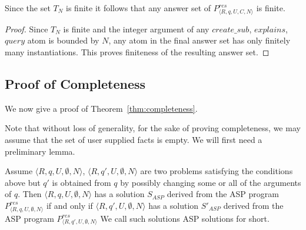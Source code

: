 \begin{lemma}
Since the set $T_{N}$ is finite it follows that any answer set of $P_{\langle
  R,q,U,C,N \rangle}^{res}$ is finite.
\end{lemma}

\begin{proof}
Since $T_{N}$ is finite and the integer argument of any $create\_sub$, $explains$, $query$ 
atom is bounded by $N$, any atom in the final answer set has only finitely
many instantiations. This proves finiteness of the resulting answer set.
\end{proof}

\subsection{Proof of Completeness}\label{sec:proof_completeness}

We now give a proof of Theorem~\ref{thm:completeness}.


Note that without loss of generality, for the sake of proving completeness, we may assume that the set of user supplied facts is empty. We will first need a preliminary lemma.

\begin{lemma}
Assume $\langle R,q,U,\emptyset,N\rangle$, $\langle R,q',U,\emptyset,N\rangle$ are two
problems satisfying the conditions above but $q'$ is obtained from $q$ by
possibly changing some or all of the arguments of $q$. Then $\langle
R,q,U,\emptyset,N\rangle$ has a solution $S_{ASP}$ derived from the ASP program $P_{\langle R,q,U,\emptyset,N\rangle}^{res}$ if and only if $\langle R,q',U,\emptyset,N\rangle$ has a solution $S'_{ASP}$ derived from the ASP program $P_{\langle R,q',U,\emptyset,N\rangle}^{res}$ We call such solutions ASP solutions for short.
\end{lemma}

